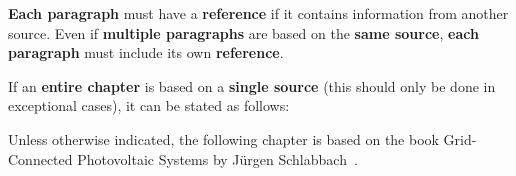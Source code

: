 \textbf{Each paragraph} must have a \textbf{reference} if it contains information from another source. Even if \textbf{multiple paragraphs} are based on the \textbf{same source}, \textbf{each paragraph} must include its own \textbf{reference}.

If an \textbf{entire chapter} is based on a \textbf{single source} (this should only be done in exceptional cases), it can be stated as follows:

Unless otherwise indicated, the following chapter is based on the book {\glqq}Grid-Connected Photovoltaic Systems{\grqq} by Jürgen Schlabbach~\cite{Schlabbach2011}.
